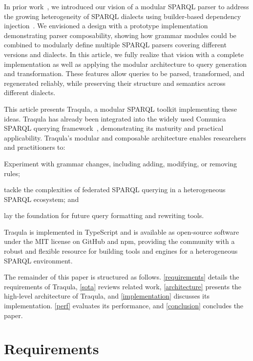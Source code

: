\documentclass[runningheads]{llncs}
\begin{document}
    In prior work~\cite{modular-parsing},
    we introduced our vision of a modular SPARQL parser to address the growing heterogeneity of SPARQL dialects using
    builder-based dependency injection~\cite{fowler-dep-inj}.
    We envisioned a design with a prototype implementation demonstrating parser composability,
    showing how grammar modules could be combined to modularly define multiple SPARQL parsers covering different versions and dialects.
    In this article, we fully realize that vision with a complete implementation
    as well as applying the modular architecture to query generation and transformation.
    These features allow queries to be parsed, transformed, and regenerated reliably, while preserving their structure and semantics across different dialects.

    This article presents Traqula, a modular SPARQL toolkit implementing these ideas.
    Traqula has already been integrated into the widely used Comunica SPARQL querying framework~\cite{comunica}, demonstrating its maturity and practical applicability.
    Traqula's modular and composable architecture enables researchers and practitioners to:
    \begin{enumerate*}[label=\arabic*.]
    \item Experiment with grammar changes, including adding, modifying, or removing rules;
    \item tackle the complexities of federated SPARQL querying in a heterogeneous SPARQL ecosystem; and
    \item lay the foundation for future query formatting and rewriting tools.
    \end{enumerate*}
    Traqula is implemented in TypeScript and is available as open-source software under the MIT license on
    GitHub and npm,
    providing the community with a robust and flexible resource for building tools and engines for a heterogeneous SPARQL environment.

    The remainder of this paper is structured as follows.
    \autoref{requirements} details the requirements of Traqula, \autoref{sota} reviews related work,
    \autoref{architecture} presents the high-level architecture of Traqula,
    and \autoref{implementation} discusses its implementation.
    \autoref{perf} evaluates its performance, and \autoref{conclusion} concludes the paper.


    \section{Requirements}
    \label{requirements}
\end{document}
